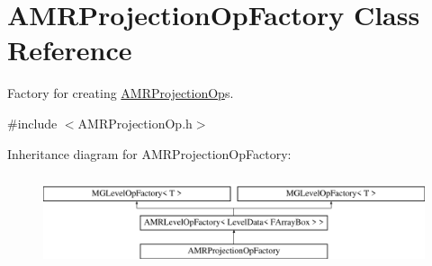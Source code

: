 \hypertarget{class_a_m_r_projection_op_factory}{}\section{A\+M\+R\+Projection\+Op\+Factory Class Reference}
\label{class_a_m_r_projection_op_factory}


Factory for creating \hyperlink{class_a_m_r_projection_op}{A\+M\+R\+Projection\+Op}\textquotesingle{}s.  




{\ttfamily \#include $<$A\+M\+R\+Projection\+Op.\+h$>$}

Inheritance diagram for A\+M\+R\+Projection\+Op\+Factory\+:\begin{figure}[H]
\begin{center}
\leavevmode
\includegraphics[height=2.736156cm]{class_a_m_r_projection_op_factory}
\end{center}
\end{figure}
